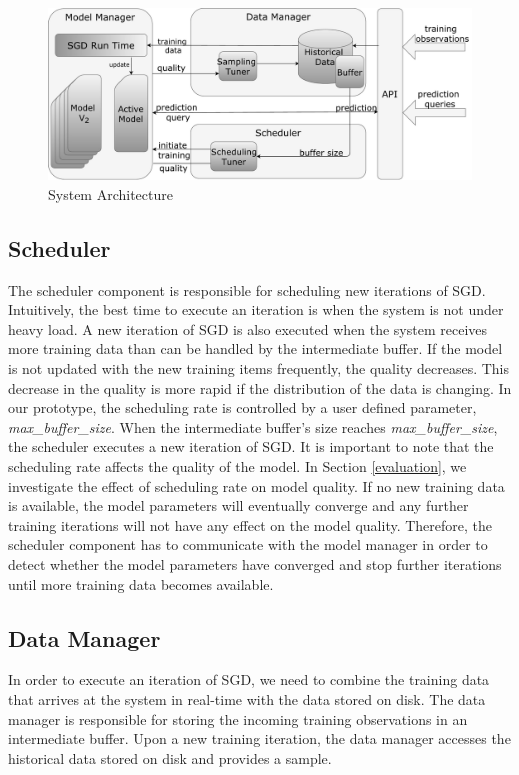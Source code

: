\begin{figure}[t]
\centering
\includegraphics[width=\columnwidth]{../images/system-architecture-final.pdf}
\caption{System Architecture}
\label{fig:system-architecture}
\end{figure}


\subsection{Scheduler}\label{scheduler}
The scheduler component is responsible for scheduling new iterations of SGD.
Intuitively, the best time to execute an iteration is when the system is not under heavy load.
A new iteration of SGD is also executed when the system receives more training data than can be handled by the intermediate buffer.
If the model is not updated with the new training items frequently, the quality decreases.
This decrease in the quality is more rapid if the distribution of the data is changing.
In our prototype, the scheduling rate is controlled by a user defined parameter, \textit{max\_buffer\_size}.
When the intermediate buffer's size reaches \textit{max\_buffer\_size}, the scheduler executes a new iteration of SGD.
It is important to note that the scheduling rate affects the quality of the model.
In Section \ref{evaluation}, we investigate the effect of scheduling rate on model quality.
If no new training data is available, the model parameters will eventually converge and any further training iterations will not have any effect on the model quality.
Therefore, the scheduler component has to communicate with the model manager in order to detect whether the model parameters have converged and stop further iterations until more training data becomes available.

\subsection{Data Manager} \label{data-manager}
In order to execute an iteration of SGD, we need to combine the training data that arrives at the system in real-time with the data stored on disk.
The data manager is responsible for storing the incoming training observations in an intermediate buffer.
Upon a new training iteration, the data manager accesses the historical data stored on disk and provides a sample.

